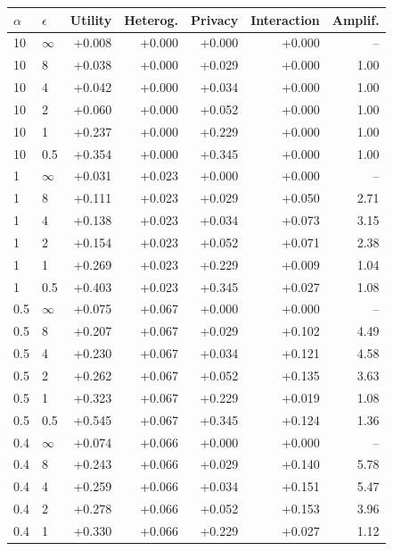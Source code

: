 \begin{tabular}{@{}llrrrrr@{}}
\toprule
$\alpha$ & $\epsilon$ & Utility & Heterog. & Privacy & Interaction & Amplif. \\
\midrule
10 & $\infty$ & +0.008 & +0.000 & +0.000 & +0.000 & -- \\
10 & 8 & +0.038 & +0.000 & +0.029 & +0.000 & 1.00 \\
10 & 4 & +0.042 & +0.000 & +0.034 & +0.000 & 1.00 \\
10 & 2 & +0.060 & +0.000 & +0.052 & +0.000 & 1.00 \\
10 & 1 & +0.237 & +0.000 & +0.229 & +0.000 & 1.00 \\
10 & 0.5 & +0.354 & +0.000 & +0.345 & +0.000 & 1.00 \\
1 & $\infty$ & +0.031 & +0.023 & +0.000 & +0.000 & -- \\
1 & 8 & +0.111 & +0.023 & +0.029 & +0.050 & 2.71 \\
1 & 4 & +0.138 & +0.023 & +0.034 & +0.073 & 3.15 \\
1 & 2 & +0.154 & +0.023 & +0.052 & +0.071 & 2.38 \\
1 & 1 & +0.269 & +0.023 & +0.229 & +0.009 & 1.04 \\
1 & 0.5 & +0.403 & +0.023 & +0.345 & +0.027 & 1.08 \\
0.5 & $\infty$ & +0.075 & +0.067 & +0.000 & +0.000 & -- \\
0.5 & 8 & +0.207 & +0.067 & +0.029 & +0.102 & 4.49 \\
0.5 & 4 & +0.230 & +0.067 & +0.034 & +0.121 & 4.58 \\
0.5 & 2 & +0.262 & +0.067 & +0.052 & +0.135 & 3.63 \\
0.5 & 1 & +0.323 & +0.067 & +0.229 & +0.019 & 1.08 \\
0.5 & 0.5 & +0.545 & +0.067 & +0.345 & +0.124 & 1.36 \\
0.4 & $\infty$ & +0.074 & +0.066 & +0.000 & +0.000 & -- \\
0.4 & 8 & +0.243 & +0.066 & +0.029 & +0.140 & 5.78 \\
0.4 & 4 & +0.259 & +0.066 & +0.034 & +0.151 & 5.47 \\
0.4 & 2 & +0.278 & +0.066 & +0.052 & +0.153 & 3.96 \\
0.4 & 1 & +0.330 & +0.066 & +0.229 & +0.027 & 1.12 \\

\end{tabular}
